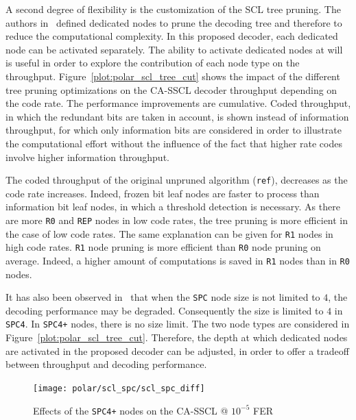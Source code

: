 A second degree of flexibility is the customization of the SCL tree pruning. The
authors in~\cite{Alamdar-Yazdi2011,Sarkis2016} defined dedicated nodes to prune
the decoding tree and therefore to reduce the computational complexity. In this
proposed decoder, each dedicated node can be activated separately. The ability
to activate dedicated nodes at will is useful in order to explore the
contribution of each node type on the throughput.
Figure~\ref{plot:polar_scl_tree_cut} shows the impact of the different tree
pruning optimizations on the CA-SSCL decoder throughput depending on the code
rate. The performance improvements are cumulative. Coded throughput, in which
the redundant bits are taken in account, is shown instead of information
throughput, for which only information bits are considered in order to
illustrate the computational effort without the influence of the fact that
higher rate codes involve higher information throughput.

The coded throughput of the original unpruned algorithm (\texttt{ref}),
decreases as the code rate increases. Indeed, frozen bit leaf nodes are faster
to process than information bit leaf nodes, in which a threshold detection is
necessary. As there are more \texttt{R0} and \texttt{REP} nodes in low code
rates, the tree pruning is more efficient in the case of low code rates. The
same explanation can be given for \texttt{R1} nodes in high code rates.
\texttt{R1} node pruning is more efficient than \texttt{R0} node pruning on
average. Indeed, a higher amount of computations is saved in \texttt{R1} nodes
than in \texttt{R0} nodes.

It has also been observed in~\cite{Sarkis2016} that when the \texttt{SPC} node
size is not limited to $4$, the decoding performance may be degraded.
Consequently the size is limited to $4$ in \texttt{SPC4}. In \texttt{SPC4+}
nodes, there is no size limit. The two node types are considered in
Figure~\ref{plot:polar_scl_tree_cut}. Therefore, the depth at which dedicated
nodes are activated in the proposed decoder can be adjusted, in order to offer a
tradeoff between throughput and decoding performance.

\begin{figure}
  \centering
  \texttt{[image: polar/scl\_spc/scl\_spc\_diff]}
  \caption{Effects of the \texttt{SPC4+} nodes on the CA-SSCL @ $10^{-5}$ FER}
  \label{fig:polar_scl_spc}
\end{figure}

